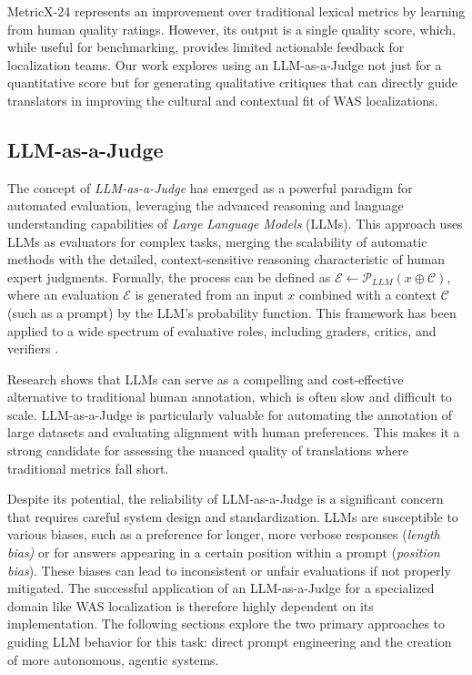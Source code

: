 \documentclass[conference]{IEEEtran}
\begin{document}
MetricX-24 represents an improvement over traditional lexical metrics by learning from human quality ratings. However, its output is a single quality score, which, while useful for benchmarking, provides limited actionable feedback for localization teams. Our work explores using an LLM-as-a-Judge not just for a quantitative score but for generating qualitative critiques that can directly guide translators in improving the cultural and contextual fit of WAS localizations.

\subsection{LLM-as-a-Judge}

The concept of \textit{LLM-as-a-Judge} has emerged as a powerful paradigm for automated evaluation, leveraging the advanced reasoning and language understanding capabilities of \textit{Large Language Models} (LLMs). This approach uses LLMs as evaluators for complex tasks, merging the scalability of automatic methods with the detailed, context-sensitive reasoning characteristic of human expert judgments. Formally, the process can be defined as $\mathcal{E} \leftarrow \mathcal{P}_{LLM}(x \oplus \mathcal{C})$, where an evaluation $\mathcal{E}$ is generated from an input $x$ combined with a context $\mathcal{C}$ (such as a prompt) by the LLM's probability function. This framework has been applied to a wide spectrum of evaluative roles, including graders, critics, and verifiers \cite{gu_survey_2025}.

Research shows that LLMs can serve as a compelling and cost-effective alternative to traditional human annotation, which is often slow and difficult to scale. LLM-as-a-Judge is particularly valuable for automating the annotation of large datasets and evaluating alignment with human preferences. This makes it a strong candidate for assessing the nuanced quality of translations where traditional metrics fall short.

Despite its potential, the reliability of LLM-as-a-Judge is a significant concern that requires careful system design and standardization. LLMs are susceptible to various biases, such as a preference for longer, more verbose responses (\textit{length bias)} or for answers appearing in a certain position within a prompt (\textit{position bias}). These biases can lead to inconsistent or unfair evaluations if not properly mitigated. The successful application of an LLM-as-a-Judge for a specialized domain like WAS localization is therefore highly dependent on its implementation. The following sections explore the two primary approaches to guiding LLM behavior for this task: direct prompt engineering and the creation of more autonomous, agentic systems.
\end{document}
